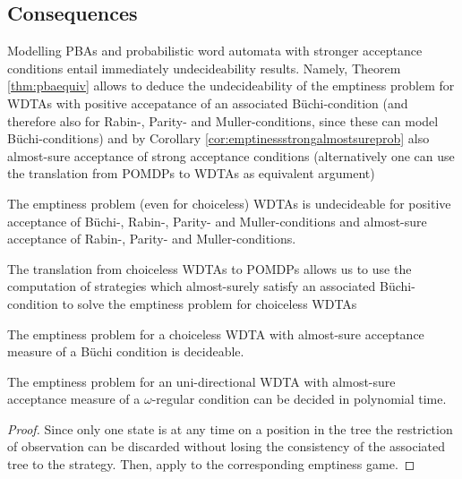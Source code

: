 \subsection{Consequences}
Modelling \acp{PBA} and probabilistic word automata with stronger acceptance 
conditions entail immediately undecideability results. Namely, Theorem 
\ref{thm:pbaequiv} allows to deduce the undecideability of the emptiness 
problem for \acp{WDTA} with positive accepatance of an associated 
Büchi-condition (and therefore also for Rabin-, Parity- and Muller-conditions,
since these can model Büchi-conditions) and by Corollary 
\ref{cor:emptinessstrongalmostsureprob} also almost-sure acceptance of strong
acceptance conditions (alternatively one can use the translation from 
\acp{POMDP} to \acp{WDTA} as equivalent argument)
\begin{corollary}
  The emptiness problem (even for choiceless) \acp{WDTA} is undecideable for
  positive acceptance of Büchi-, Rabin-, Parity- and Muller-conditions and
  almost-sure acceptance of Rabin-, Parity- and Muller-conditions.
\end{corollary}
The translation from choiceless \acp{WDTA} to \acp{POMDP} allows us to use the 
computation of strategies which almost-surely satisfy an associated 
Büchi-condition to solve the emptiness problem for choiceless \acp{WDTA}
\begin{corollary}
  The emptiness problem for a choiceless \ac{WDTA} with almost-sure acceptance 
  measure of a Büchi condition is decideable.
  \label{cor:emptiness}
\end{corollary}
\begin{corollary}
  The emptiness problem for an uni-directional \ac{WDTA} with almost-sure
  acceptance measure of a $\omega$-regular condition can be decided in
  polynomial time.
\end{corollary}
\begin{proof}
  Since only one state is at any time on a position in the tree the restriction
  of observation can be discarded without losing the consistency of the
  associated tree to the strategy. Then, apply
  \cite[Theorem 3]{RandAutoInfTrees} to the corresponding emptiness game.
\end{proof}


